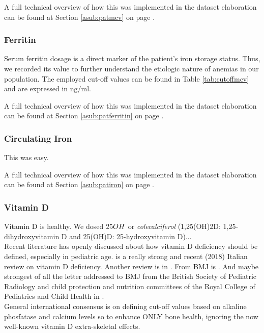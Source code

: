 
A full technical overview of how this was implemented in the dataset elaboration can be found at Section \ref{asub:patmcv} on page \pageref{asub:patmcv}.

\subsubsection{Ferritin}\label{sub:ferritin}
Serum ferritin dosage is a direct marker of the patient's iron storage status. Thus, we recorded its value to further understand the etiologic nature of anemias in our population. The employed cut-off values can be found in Table \ref{tab:cutoffmcv} and are expressed in $\si{\nano\gram/\milli\litre}$.

A full technical overview of how this was implemented in the dataset elaboration can be found at Section \ref{asub:patferritin} on page \pageref{asub:patferritin}.

\subsubsection{Circulating Iron}\label{sub:iron}
This was easy.

A full technical overview of how this was implemented in the dataset elaboration can be found at Section \ref{asub:patiron} on page \pageref{asub:patiron}.


\subsubsection{Vitamin D}\label{sub:vitaminD}
Vitamin D is healthy. We dosed $25\-OH$ or \textit{colecalciferol} (1,25(OH)2D: 1,25-dihydroxyvitamin D and 25(OH)D: 25-hydroxyvitamin D)...\\
Recent literature has openly discussed about how vitamin D deficiency should be defined, especially in pediatric age. \cite{vitDcutoff1} is a really strong and recent (2018) Italian review on vitamin D deficiency. Another review is in \cite{vitDcutoff2}. From BMJ is \cite{vitDcutoff3}. And maybe strongest of all the letter addressed to BMJ from the British Society of Pediatric Radiology and child protection and nutrition committees of the Royal College of Pediatrics and Child Health in \cite{vitDcutoff_letter}.\\
General international consensus is on defining cut-off values based on alkaline phosfatase and calcium levels so to enhance ONLY bone health, ignoring the now well-known vitamin D extra-skeletal effects.

